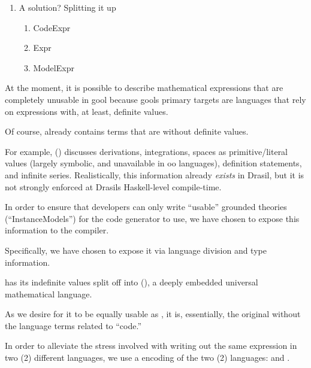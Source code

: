 
\begin{enumerate}
    \item A solution? Splitting it up
    \begin{enumerate}
        \item CodeExpr
        \item Expr
        \item ModelExpr
    \end{enumerate}
\end{enumerate}

At the moment, it is possible to describe mathematical expressions that are
completely unusable in \acs{gool} because \acsp{gool} primary targets are
languages that rely on expressions with, at least, definite values.

Of course, \Expr{} already contains terms that are without definite values.

For example, \Expr{} () discusses derivations,
integrations, spaces as primitive/literal values (largely symbolic, and
unavailable in \acs{oo} languages), definition statements, and infinite series.
Realistically, this information already \textit{exists} in Drasil, but it is not
strongly enforced at Drasils Haskell-level compile-time.





In order to ensure that developers can only write ``usable'' grounded theories
(``InstanceModels'') for the code generator to use, we have chosen to expose
this information to the compiler.

Specifically, we have chosen to expose it via language division and type
information.

\languageDivision{}

\Expr{} has its indefinite values split off into \ModelExpr{}
(), a deeply embedded universal mathematical
language.

As we desire for it to be equally usable as \Expr{}, it is, essentially, the
original \Expr{} without the language terms related to ``code.''

In order to alleviate the stress involved with writing out the same expression
in two (2) different languages, we use a  encoding of the two (2)
languages:  and . 

